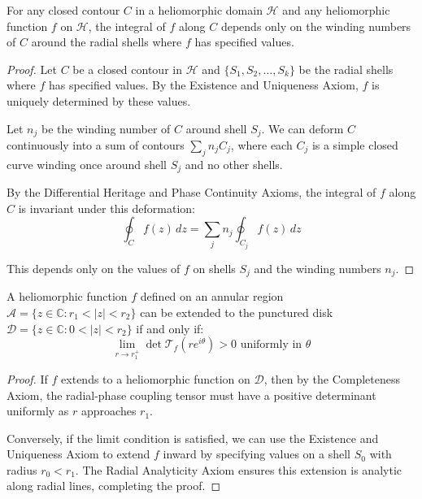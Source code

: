 \begin{theorem}
For any closed contour $C$ in a heliomorphic domain $\mathcal{H}$ and any heliomorphic function $f$ on $\mathcal{H}$, the integral of $f$ along $C$ depends only on the winding numbers of $C$ around the radial shells where $f$ has specified values.
\end{theorem}

\begin{proof}
Let $C$ be a closed contour in $\mathcal{H}$ and $\{S_1, S_2, \ldots, S_k\}$ be the radial shells where $f$ has specified values. By the Existence and Uniqueness Axiom, $f$ is uniquely determined by these values.

Let $n_j$ be the winding number of $C$ around shell $S_j$. We can deform $C$ continuously into a sum of contours $\sum_j n_j C_j$, where each $C_j$ is a simple closed curve winding once around shell $S_j$ and no other shells.

By the Differential Heritage and Phase Continuity Axioms, the integral of $f$ along $C$ is invariant under this deformation:
\begin{equation}
\oint_C f(z) \, dz = \sum_j n_j \oint_{C_j} f(z) \, dz
\end{equation}

This depends only on the values of $f$ on shells $S_j$ and the winding numbers $n_j$.
\end{proof}

\begin{theorem}
A heliomorphic function $f$ defined on an annular region $\mathcal{A} = \{z \in \mathbb{C} : r_1 < |z| < r_2\}$ can be extended to the punctured disk $\mathcal{D} = \{z \in \mathbb{C} : 0 < |z| < r_2\}$ if and only if:
\begin{equation}
\lim_{r \to r_1^+} \det\mathcal{T}_f(re^{i\theta}) > 0 \text{ uniformly in } \theta
\end{equation}
\end{theorem}

\begin{proof}
If $f$ extends to a heliomorphic function on $\mathcal{D}$, then by the Completeness Axiom, the radial-phase coupling tensor must have a positive determinant uniformly as $r$ approaches $r_1$.

Conversely, if the limit condition is satisfied, we can use the Existence and Uniqueness Axiom to extend $f$ inward by specifying values on a shell $S_0$ with radius $r_0 < r_1$. The Radial Analyticity Axiom ensures this extension is analytic along radial lines, completing the proof.
\end{proof}

